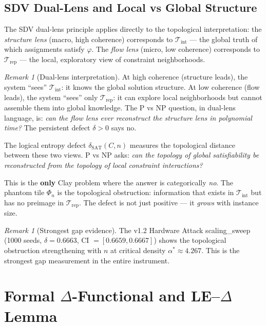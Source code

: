\documentclass[11pt]{article}
\theoremstyle{definition}
\theoremstyle{remark}
\newtheorem{remark}[theorem]{Remark}
\begin{document}
\subsection{SDV Dual-Lens and Local vs Global Structure}

The SDV dual-lens principle applies directly to the topological
interpretation: the \emph{structure lens} (macro, high coherence)
corresponds to $\mathcal{T}_{\mathrm{int}}$ --- the global truth
of which assignments satisfy $\varphi$.  The \emph{flow lens}
(micro, low coherence) corresponds to $\mathcal{T}_{\mathrm{rep}}$
--- the local, exploratory view of constraint neighborhoods.

\begin{remark}[Dual-lens interpretation]
At high coherence (structure leads), the system ``sees''
$\mathcal{T}_{\mathrm{int}}$: it knows the global solution structure.
At low coherence (flow leads), the system ``sees'' only
$\mathcal{T}_{\mathrm{rep}}$: it can explore local neighborhoods but
cannot assemble them into global knowledge.  The P vs NP question,
in dual-lens language, is: \emph{can the flow lens ever reconstruct
the structure lens in polynomial time?}  The persistent defect
$\delta > 0$ says no.
\end{remark}

\noindent
The logical entropy defect $\delta_{\mathrm{SAT}}(C, n)$ measures the
topological distance between these two views.  P vs NP asks:
\emph{can the topology of global satisfiability be reconstructed from
the topology of local constraint interactions?}

This is the \textbf{only} Clay problem where the answer is categorically
\emph{no}.  The phantom tile $\Phi_n$ is the topological obstruction:
information that exists in $\mathcal{T}_{\mathrm{int}}$ but has no
preimage in $\mathcal{T}_{\mathrm{rep}}$.  The defect is not just
positive --- it \emph{grows} with instance size.

\begin{remark}[Strongest gap evidence]
The v1.2 Hardware Attack scaling\_sweep (1000 seeds, $\delta = 0.6663$,
CI $= [0.6659, 0.6667]$) shows the topological obstruction strengthening
with $n$ at critical density $\alpha^* \approx 4.267$.  This is the
strongest gap measurement in the entire instrument.
\end{remark}

\section{Formal $\Delta$-Functional and LE--$\Delta$ Lemma}
\label{sec:delta-functional}
\end{document}
